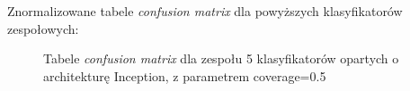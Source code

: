 \documentclass[polish,12pt]{aghthesis}
\begin{document}
\newpage
\noindent Znormalizowane tabele \textit{confusion matrix} dla powyższych klasyfikatorów zespołowych:
\begin{figure}[h!]%
    \begin{adjustbox}{minipage=1.0\paperwidth, pagecenter}
    \centering
    \qquad
    \end{adjustbox}
    \label{fig:inc-ens-5-0.5-matrices}
    \caption{Tabele \textit{confusion matrix} dla zespołu 5 klasyfikatorów opartych o architekturę Inception, z parametrem coverage=0.5}
\end{figure}
\end{document}
